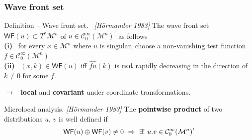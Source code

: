 \documentclass[9pt]{beamer}
\newcommand{\WF}{\mathsf{WF}}
\newcommand{\citebeam}[1]{\textit{\textcolor{black!60!white}{[#1]}}}
\newcommand{\Ccal}{\mathcal{C}}
\newcommand{\Mcal}{\mathcal{M}}
\begin{document}
\begin{frame}[label=wf]

\frametitle{Wave front set}

\vfill

\begin{block}{Definition -- Wave front set. \ \citebeam{Hörmander 1983} \hfill \hyperlink{details_wf}{}}
\vspace*{-8pt}
The wave front set $\WF(u) \subset T^\ast\Mcal^n$ of $u \in \Ccal^\infty_0(\Mcal^n)^\prime$ as follows \\
\qquad \textbf{(i)} \ for every $x \in \Mcal^n$ where $u$ is singular, choose a non-vanishing test function $f \in \Ccal^\infty_0(\Mcal^n)$ \\
\qquad \textbf{(ii)} \ $(x,k) \in \WF(u)$ iff $\hat{fu}(k)$ is \textbf{not} rapidly decreasing in the direction of $k \neq 0$ for some $f$.
\end{block}

$\to$ \ \textbf{local} and \textbf{covariant} under coordinate transformations.

\vfill

\begin{block}{Microlocal analysis. \citebeam{Hörmander 1983}}
\vspace*{-8pt}
The \textbf{pointwise product} of two distributions $u$, $v$ is well defined if 
\vspace*{-10pt}
\begin{equation*}
\WF(u) \oplus \WF(v) \neq 0 \ \Rightarrow \ \exists! \ u.v \in \Ccal^\infty_0(\Mcal^n)^{\prime} 
\vspace*{-8pt}
\end{equation*}
\end{block}

\vfill 

\end{frame}

\end{document}
